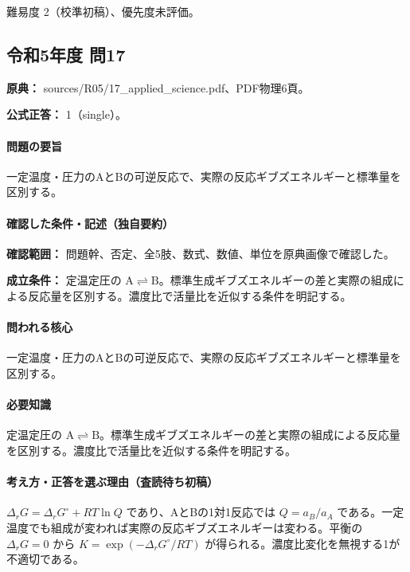 \par 難易度 2（校準初稿）、優先度未評価。

\subsection{令和5年度 問17}
\label{q:r05-reg-applied-17}

\noindent\textbf{原典：} sources/R05/17\_applied\_science.pdf、PDF物理6頁。

\textbf{公式正答：} 1（single）。

\paragraph{問題の要旨} 一定温度・圧力のAとBの可逆反応で、実際の反応ギブズエネルギーと標準量を区別する。

\paragraph{確認した条件・記述（独自要約）}\mbox{}\par

\noindent\textbf{確認範囲：} 問題幹、否定、全5肢、数式、数値、単位を原典画像で確認した。\par

\noindent\textbf{成立条件：} 定温定圧の \(\mathrm{A\rightleftharpoons B}\)。標準生成ギブズエネルギーの差と実際の組成による反応量を区別する。濃度比で活量比を近似する条件を明記する。\par

\paragraph{問われる核心} 一定温度・圧力のAとBの可逆反応で、実際の反応ギブズエネルギーと標準量を区別する。

\paragraph{必要知識} 定温定圧の \(\mathrm{A\rightleftharpoons B}\)。標準生成ギブズエネルギーの差と実際の組成による反応量を区別する。濃度比で活量比を近似する条件を明記する。

\paragraph{考え方・正答を選ぶ理由（査読待ち初稿）} \(\Delta_rG=\Delta_rG^\circ+RT\ln Q\) であり、AとBの1対1反応では \(Q=a_B/a_A\) である。一定温度でも組成が変われば実際の反応ギブズエネルギーは変わる。平衡の \(\Delta_rG=0\) から \(K=\exp(-\Delta_rG^\circ/RT)\) が得られる。濃度比変化を無視する1が不適切である。


